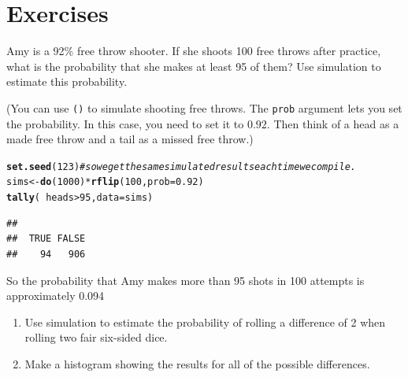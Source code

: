 \documentclass[twoside]{book}\usepackage[]{graphicx}\usepackage[]{xcolor}
\makeatletter
\newcommand{\hlnum}[1]{\textcolor[rgb]{0.686,0.059,0.569}{#1}}%
\newcommand{\hlcom}[1]{\textcolor[rgb]{0.678,0.584,0.686}{\textit{#1}}}%
\newcommand{\hlopt}[1]{\textcolor[rgb]{0,0,0}{#1}}%
\newcommand{\hlstd}[1]{\textcolor[rgb]{0.345,0.345,0.345}{#1}}%
\newcommand{\hlkwb}[1]{\textcolor[rgb]{0.69,0.353,0.396}{#1}}%
\newcommand{\hlkwc}[1]{\textcolor[rgb]{0.333,0.667,0.333}{#1}}%
\newcommand{\hlkwd}[1]{\textcolor[rgb]{0.737,0.353,0.396}{\textbf{#1}}}%
\newenvironment{kframe}{%
 \def\at@end@of@kframe{}%
 \ifinner\ifhmode%
  \def\at@end@of@kframe{\end{minipage}}%
  \begin{minipage}{\columnwidth}%
 \fi\fi%
 \def\FrameCommand##1{\hskip\@totalleftmargin \hskip-\fboxsep
 \colorbox{shadecolor}{##1}\hskip-\fboxsep
     \hskip-\linewidth \hskip-\@totalleftmargin \hskip\columnwidth}%
 \MakeFramed {\advance\hsize-\width
   \@totalleftmargin\z@ \linewidth\hsize
   \@setminipage}}%
 {\par\unskip\endMakeFramed%
 \at@end@of@kframe}
\newenvironment{knitrout}{}{} %
\newcommand{\Rindex}[1]{\index{\texttt{#1}}}
\newcommand{\function}[1]{{\color{purple!75!blue}\texttt{\StrSubstitute{#1}{()}{}()}}\Rindex{#1}}
\newcommand{\option}[1]{{\color{brown!80!black}\texttt{#1}}}
\makeatother
\begin{document}
\newpage
\section*{Exercises}

\begin{problem}
	Amy is a 92\% free throw shooter.  If she shoots
	100 free throws after practice, what is the probability that she
	makes at least 95 of them?  Use simulation to estimate this probability.

	(You can use \function{rflip()} to simulate shooting free throws.
	The \option{prob} argument lets you set the probability.  In this case,
	you need to set it to $0.92$.  Then think of a head as a made free throw
	and a tail as a missed free throw.)
\end{problem}

\begin{solution}
\begin{knitrout}
\color{fgcolor}\begin{kframe}
\begin{alltt}
\hlkwd{set.seed}\hlstd{(}\hlnum{123}\hlstd{)}  \hlcom{# so we get the same simulated results each time we compile.}
\hlstd{sims} \hlkwb{<-} \hlkwd{do}\hlstd{(}\hlnum{1000}\hlstd{)} \hlopt{*} \hlkwd{rflip}\hlstd{(}\hlnum{100}\hlstd{,} \hlkwc{prob} \hlstd{=} \hlnum{0.92}\hlstd{)}
\hlkwd{tally}\hlstd{(}\hlopt{~}\hlstd{heads} \hlopt{>} \hlnum{95}\hlstd{,} \hlkwc{data} \hlstd{= sims)}
\end{alltt}
\begin{verbatim}
## 
##  TRUE FALSE 
##    94   906
\end{verbatim}
\end{kframe}
\end{knitrout}
So the probability that Amy makes more than 95 shots in 100 attempts is approximately
0.094
\end{solution}

\begin{problem}
	\begin{enumerate}
		\item
	Use simulation to estimate the probability of rolling a difference of 2 when rolling
	two fair six-sided dice.
\item
	Make a histogram showing the results for all of the possible differences.
	\end{enumerate}

\end{problem}
\end{document}
